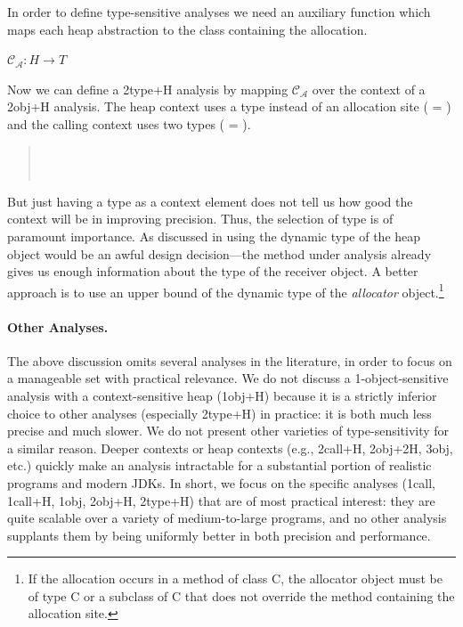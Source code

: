 In order to define type-sensitive analyses we need an auxiliary function which maps each heap abstraction to the class containing the allocation.

$\mathcal{C_A}: H \rightarrow T$

Now we can define a 2type+H analysis by mapping $\mathcal{C_A}$ over the context of a 2obj+H analysis. The heap context uses a type instead of an allocation site ( = ) and the calling context uses two types ( = ).

\begin{quote}
 \\
 \\
\end{quote}

But just having a type as a context element does not tell us how good the context will be in improving precision. Thus, the selection of type is of paramount importance. As discussed in \cite{popl:2011:Smaragdakis} using the dynamic type of the heap object would be an awful design decision---the method under analysis already gives us enough information about the type of the receiver object. A better approach is to use an upper bound of the dynamic type of the \emph{allocator} object.\footnote{If the allocation occurs in a method of class C, the allocator object must be of type C or a subclass of C that does not override the method containing the allocation site.}

\paragraph{Other Analyses.}
The above discussion omits several analyses in the literature, in order to focus on a manageable set with practical relevance. We do not discuss a 1-object-sensitive analysis with a context-sensitive heap (1obj+H) because it is a strictly inferior choice to other analyses (especially 2type+H) in practice: it is both much less precise and much slower. We do not present other varieties of type-sensitivity for a similar reason. Deeper contexts or heap contexts (e.g., 2call+H, 2obj+2H, 3obj, etc.) quickly make an analysis intractable for a substantial portion of realistic programs and modern JDKs. In short, we focus on the specific analyses (1call, 1call+H, 1obj, 2obj+H, 2type+H) that are of most practical interest: they are quite scalable over a variety of medium-to-large programs, and no other analysis supplants them by being uniformly better in both precision and performance.



